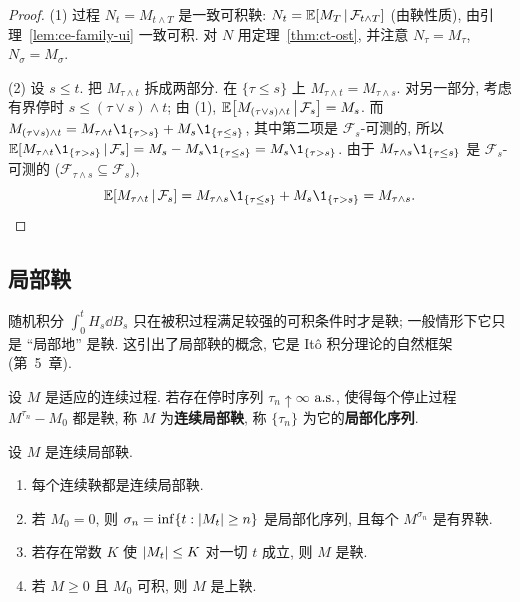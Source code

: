 \begin{proof}
(1) 过程 $N_t=M_{t\wedge T}$ 是一致可积鞅: $N_t=\mathbb{E}[M_T\,|\,\mathcal{F}_{t\wedge T}]$ (由鞅性质), 由引理~\ref{lem:ce-family-ui} 一致可积. 对 $N$ 用定理~\ref{thm:ct-ost}, 并注意 $N_\tau=M_\tau$, $N_\sigma=M_\sigma$.

(2) 设 $s\le t$. 把 $M_{\tau\wedge t}$ 拆成两部分. 在 $\{\tau\le s\}$ 上 $M_{\tau\wedge t}=M_{\tau\wedge s}$. 对另一部分, 考虑有界停时 $s\le(\tau\vee s)\wedge t$; 由 (1),
$\mathbb{E}\big[M_{(\tau\vee s)\wedge t}\,\big|\,\mathcal{F}_s\big]=M_s$. 而 $M_{(\tau\vee s)\wedge t}=M_{\tau\wedge t}\1_{\{\tau>s\}}+M_s\1_{\{\tau\le s\}}$, 其中第二项是 $\mathcal{F}_s$-可测的, 所以
$\E[M_{\tau\wedge t}\1_{\{\tau>s\}}\,|\,\mathcal{F}_s]=M_s-M_s\1_{\{\tau\le s\}}=M_s\1_{\{\tau>s\}}$. 由于 $M_{\tau\wedge s}\1_{\{\tau\le s\}}$ 是 $\mathcal{F}_s$-可测的 ($\mathcal{F}_{\tau\wedge s}\subseteq\mathcal{F}_s$),
\[
\E[M_{\tau\wedge t}\,|\,\mathcal{F}_s]=M_{\tau\wedge s}\1_{\{\tau\le s\}}+M_s\1_{\{\tau>s\}}=M_{\tau\wedge s}.\qedhere
\]
\end{proof}

\subsection{局部鞅}

随机积分 $\int_0^tH_s\dd B_s$ 只在被积过程满足较强的可积条件时才是鞅; 一般情形下它只是 ``局部地'' 是鞅. 这引出了局部鞅的概念, 它是 Itô 积分理论的自然框架 (第~5~章).

\begin{definition}[局部鞅]\label{def:local-martingale}
设 $M$ 是适应的连续过程. 若存在停时序列 $\tau_n\uparrow\infty$ $\text{a.s.}$, 使得每个停止过程 $M^{\tau_n}-M_0$ 都是鞅, 称 $M$ 为\textbf{连续局部鞅}, 称 $\{\tau_n\}$ 为它的\textbf{局部化序列}.
\end{definition}

\begin{proposition}\label{prop:local-martingale}
设 $M$ 是连续局部鞅.
\begin{enumerate}
\item 每个连续鞅都是连续局部鞅.
\item 若 $M_0=0$, 则 $\sigma_n=\inf\{t: \lvert M_t\rvert\ge n\}$ 是局部化序列, 且每个 $M^{\sigma_n}$ 是有界鞅.
\item 若存在常数 $K$ 使 $\lvert M_t\rvert\le K$ 对一切 $t$ 成立, 则 $M$ 是鞅.
\item 若 $M\ge0$ 且 $M_0$ 可积, 则 $M$ 是上鞅.
\end{enumerate}
\end{proposition}

